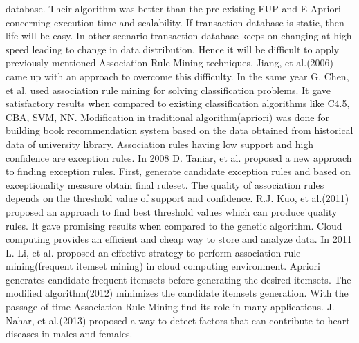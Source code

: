 \documentclass[review]{elsarticle}
\begin{document}
database. Their algorithm was better than the pre-existing FUP and E-Apriori concerning execution time and scalability. If transaction database is static, then life will be easy. In other scenario transaction database keeps on changing at high speed leading to change in data distribution. Hence it will be difficult to apply previously mentioned Association Rule Mining techniques. Jiang, et al.(2006) \cite{dynamicarm} came up with an approach to overcome this difficulty. In the same year G. Chen, et al. \cite{classify} used association rule mining for solving classification problems. It gave satisfactory results when compared to existing classification algorithms like C4.5, CBA, SVM, NN. Modification in traditional algorithm(apriori) was done \cite{bookrecommend} for building book recommendation system based on the data obtained from historical data of university library. Association rules having low support and high confidence are exception rules. In 2008 D. Taniar, et al. \cite{exceptionrules} proposed a new approach to finding exception rules. First, generate candidate exception rules and based on exceptionality measure obtain final ruleset. The quality of association rules depends on the threshold value of support and confidence. R.J. Kuo, et al.(2011) \cite{swarmarm} proposed an approach to find best threshold values which can produce quality rules. It gave promising results when compared to the genetic algorithm. Cloud computing provides an efficient and cheap way to store and analyze data. In 2011 L. Li, et al. \cite{cloudarm} proposed an effective strategy to perform association rule mining(frequent itemset mining) in cloud computing environment. Apriori \cite{fastapriori} generates candidate frequent itemsets before generating the desired itemsets. The modified algorithm(2012) \cite{minmizcandidt} minimizes the candidate itemsets generation. With the passage of time Association Rule Mining find its role in many applications. J. Nahar, et al.(2013) \cite{armheart} proposed a way to detect factors that can contribute to heart diseases in males and females.
\end{document}
